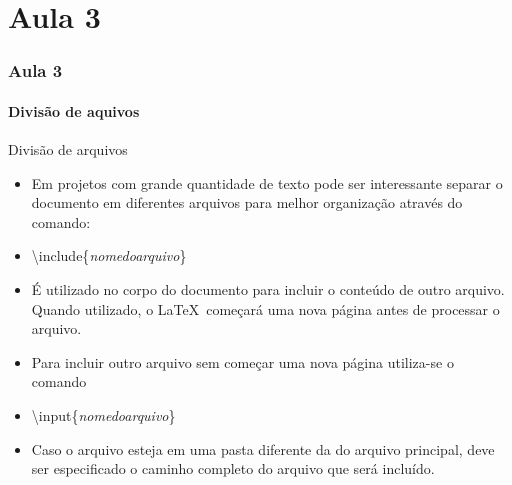 \part{Aula 3}
\section{Aula 3}

\subsection{Divisão de aquivos}
\begin{frame}{Divisão de arquivos}

    \begin{itemize}
    \item Em projetos com grande quantidade de texto pode ser interessante separar o documento em diferentes arquivos para melhor organização através do comando:    
    \item[] \alert{\textbackslash include\{\textit{nomedoarquivo}\}}
    \item É utilizado no corpo do documento para incluir o conteúdo de outro arquivo. Quando utilizado, o \LaTeX\ começará uma nova página antes de processar o arquivo.
    \item Para incluir outro arquivo sem começar uma nova página utiliza-se o comando
    \item[] \alert{\textbackslash input\{\textit{nomedoarquivo}\}}
    \item Caso o arquivo esteja em uma pasta diferente da do arquivo principal, deve ser especificado o caminho completo do arquivo que será incluído.
    \end{itemize}

\end{frame}
  
